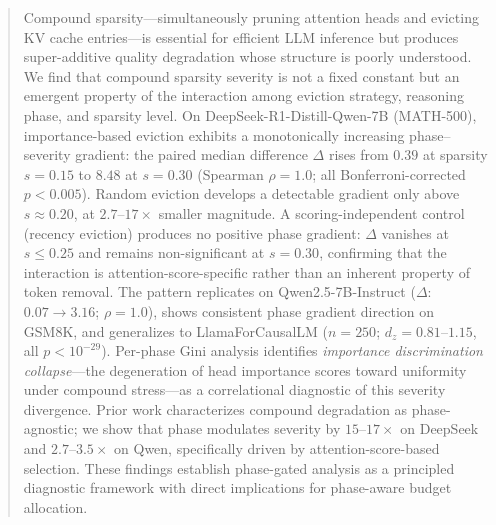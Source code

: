 \begin{abstract}
Compound sparsity---simultaneously pruning attention heads and evicting KV cache entries---is essential for efficient LLM inference but produces super-additive quality degradation whose structure is poorly understood.
We find that compound sparsity severity is not a fixed constant but an emergent property of the interaction among eviction strategy, reasoning phase, and sparsity level.
On DeepSeek-R1-Distill-Qwen-7B (MATH-500), importance-based eviction exhibits a monotonically increasing phase--severity gradient: the paired median difference $\Delta$ rises from $0.39$ at sparsity $s{=}0.15$ to $8.48$ at $s{=}0.30$ (Spearman $\rho{=}1.0$; all Bonferroni-corrected $p < 0.005$).
Random eviction develops a detectable gradient only above $s \approx 0.20$, at $2.7$--$17{\times}$ smaller magnitude.
A scoring-independent control (recency eviction) produces no positive phase gradient: $\Delta$ vanishes at $s \leq 0.25$ and remains non-significant at $s{=}0.30$, confirming that the interaction is attention-score-specific rather than an inherent property of token removal.
The pattern replicates on Qwen2.5-7B-Instruct ($\Delta$: $0.07 \to 3.16$; $\rho{=}1.0$), shows consistent phase gradient direction on GSM8K, and generalizes to LlamaForCausalLM ($n{=}250$; $d_z{=}0.81$--$1.15$, all $p < 10^{-29}$).
Per-phase Gini analysis identifies \emph{importance discrimination collapse}---the degeneration of head importance scores toward uniformity under compound stress---as a correlational diagnostic of this severity divergence.
Prior work characterizes compound degradation as phase-agnostic; we show that phase modulates severity by $15$--$17{\times}$ on DeepSeek and $2.7$--$3.5{\times}$ on Qwen, specifically driven by attention-score-based selection. These findings establish phase-gated analysis as a principled diagnostic framework with direct implications for phase-aware budget allocation.
\end{abstract}
